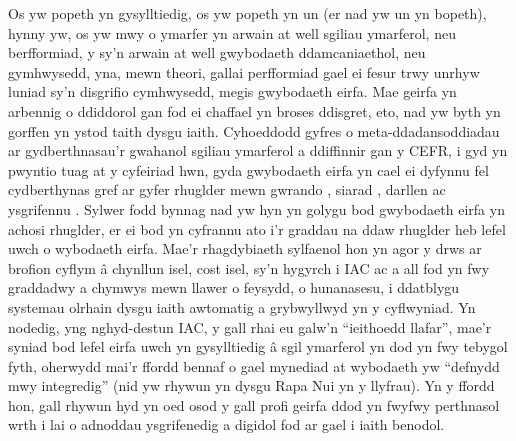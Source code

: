 Os yw popeth yn gysylltiedig, os yw popeth yn un (er nad yw un yn bopeth), hynny yw, os yw mwy o ymarfer yn arwain at well sgiliau ymarferol, neu berfformiad, y sy'n arwain at well gwybodaeth ddamcaniaethol, neu gymhwysedd, yna, mewn theori, gallai perfformiad gael ei fesur trwy unrhyw luniad sy'n disgrifio cymhwysedd, megis gwybodaeth eirfa. Mae geirfa yn arbennig o ddiddorol gan fod ei chaffael yn broses ddisgret, eto, nad yw byth yn gorffen yn ystod taith dysgu iaith. Cyhoeddodd \textcite{eun_hee_jeon_understanding_2022} gyfres o meta-ddadansoddiadau ar gydberthnasau'r gwahanol sgiliau ymarferol a ddiffinnir gan y CEFR, i gyd yn pwyntio tuag at y cyfeiriad hwn, gyda gwybodaeth eirfa yn cael ei dyfynnu fel cydberthynas gref ar gyfer rhuglder mewn gwrando \parencite{innami_meta-analysis_2022}, siarad \parencite{jeon_meta-analysis_2022}, darllen \parencite{jeon_updated_2022} ac ysgrifennu \parencite{kojima_meta-analysis_2022}. Sylwer fodd bynnag nad yw hyn yn golygu bod gwybodaeth eirfa yn achosi rhuglder, er ei bod yn cyfrannu ato i'r graddau na ddaw rhuglder heb lefel uwch o wybodaeth eirfa. Mae'r rhagdybiaeth sylfaenol hon yn agor y drws ar brofion cyflym â chynllun isel, cost isel, sy'n hygyrch i IAC ac a all fod yn fwy graddadwy a chymwys mewn llawer o feysydd, o hunanasesu, i ddatblygu systemau olrhain dysgu iaith awtomatig a grybwyllwyd yn y cyflwyniad. Yn nodedig, yng nghyd-destun IAC, y gall rhai eu galw'n ``ieithoedd llafar'', mae'r syniad bod lefel eirfa uwch yn gysylltiedig â sgil ymarferol yn dod yn fwy tebygol fyth, oherwydd mai'r ffordd bennaf o gael mynediad at wybodaeth yw ``defnydd mwy integredig'' (nid yw rhywun yn dysgu Rapa Nui yn y llyfrau). Yn y ffordd hon, gall rhywun hyd yn oed osod y gall profi geirfa ddod yn fwyfwy perthnasol wrth i lai o adnoddau ysgrifenedig a digidol fod ar gael i iaith benodol.

